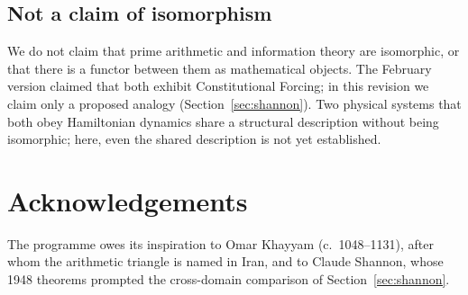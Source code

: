 \documentclass[12pt]{amsart}
\theoremstyle{plain}
\theoremstyle{definition}
\theoremstyle{remark}
\begin{document}
\subsection{Not a claim of isomorphism}

We do not claim that prime arithmetic and information theory are isomorphic, or
that there is a functor between them as mathematical objects. The February
version claimed that both exhibit Constitutional Forcing; in this revision we
claim only a proposed analogy (Section~\ref{sec:shannon}). Two physical systems
that both obey Hamiltonian dynamics share a structural description without
being isomorphic; here, even the shared description is not yet established.

\section*{Acknowledgements}

The programme owes its inspiration to Omar Khayyam (c.~1048--1131), after
whom the arithmetic triangle is named in Iran, and to Claude Shannon, whose
1948 theorems prompted the cross-domain comparison of
Section~\ref{sec:shannon}.
\end{document}
